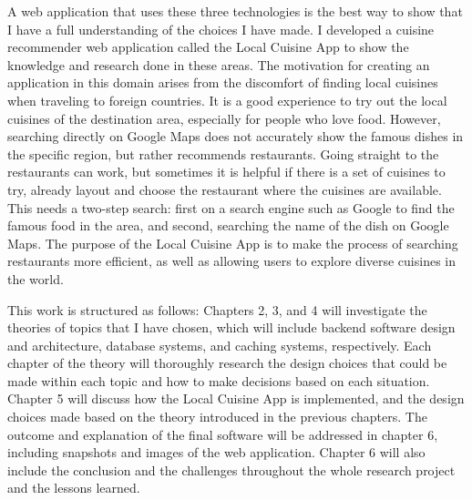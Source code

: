 A web application that uses these three technologies is the best way to show that I have a full understanding of the choices I have made.
I developed a cuisine recommender web application called the Local Cuisine App to show the knowledge and research done in these areas.
The motivation for creating an application in this domain arises from the discomfort of finding local cuisines when traveling to foreign countries.
It is a good experience to try out the local cuisines of the destination area, especially for people who love food.
However, searching directly on Google Maps does not accurately show the famous dishes in the specific region,
but rather recommends restaurants. Going straight to the restaurants can work,
but sometimes it is helpful if there is a set of cuisines to try, already layout and choose the restaurant where the cuisines are available.
This needs a two-step search: first on a search engine such as Google to find the famous food in the area, and second, searching the name of the dish on Google Maps.
The purpose of the Local Cuisine App is to make the process of searching restaurants more efficient, as well as allowing users to explore diverse cuisines in the world.

This work is structured as follows: Chapters 2, 3, and 4 will investigate the theories of topics that I have chosen, 
which will include backend software design and architecture, database systems, and caching systems, respectively. Each chapter of the theory will thoroughly research the 
design choices that could be made within each topic and how to make decisions based on each situation. Chapter 5 will discuss how the Local Cuisine App
is implemented, and the design choices made based on the theory introduced in the previous chapters. The outcome and explanation of the final software will be addressed in 
chapter 6, including snapshots and images of the web application. Chapter 6 will also include the conclusion and the challenges throughout the whole research project and the lessons learned.




